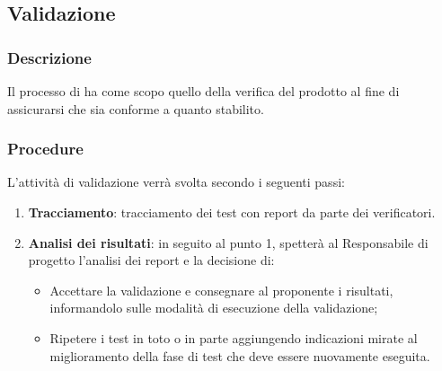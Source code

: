 \subsection{Validazione}
\label{sec:validazione}
\subsubsection{Descrizione}
Il processo di  ha come scopo quello della verifica del prodotto al fine di assicurarsi che sia conforme a quanto stabilito.
\subsubsection{Procedure}
L’attività di validazione verrà svolta secondo i seguenti passi:
\begin{enumerate} 
    \item \textbf{Tracciamento}: tracciamento dei test con report da parte dei verificatori.
    \item \textbf{Analisi dei risultati}: in seguito al punto 1, spetterà al Responsabile di progetto l’analisi dei report e la decisione di:
    \begin{itemize}
        \item Accettare la validazione e consegnare al proponente i risultati, informandolo sulle modalità di esecuzione della validazione;
        \item Ripetere i test in toto o in parte aggiungendo indicazioni mirate al miglioramento della fase di test che deve essere nuovamente eseguita.
    \end{itemize}
\end{enumerate}

